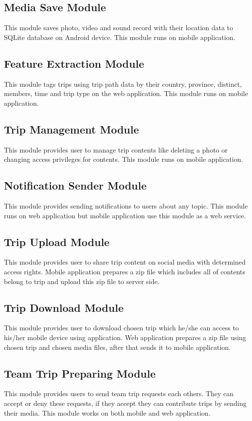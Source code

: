 \subsection{Media Save Module}
This module saves photo, video and sound record with their location data to SQLite database on Android device. This module runs on mobile application.
\subsection{Feature Extraction Module}
This module tags trips using trip path data by their country, province, distinct, members, time and trip type on the web application. This module runs on mobile application.
\subsection{Trip Management Module}
This module provides user to manage trip contents like deleting a photo or changing access privileges for contents. This module runs on mobile application.
\subsection{Notification Sender Module}   
This module provides sending notifications to users about any topic. This module runs on web application but mobile application use this module as a web service.
\subsection{Trip Upload Module}
This module provides user to share trip content on social media with determined access rights. Mobile application prepares a zip file which includes all of contents belong to trip and upload this zip file to server side.
\subsection{Trip Download Module}
This module provides user to download chosen trip  which he/she can access to his/her mobile device using application. Web application prepares a zip file using chosen trip and chosen media files, after that sends it to mobile application.
\subsection{Team Trip Preparing Module}
This module provides users to send team trip requests each others. They can accept or deny these requests, if they accept they can contribute trips by sending their media. This module works on both mobile and web application.

